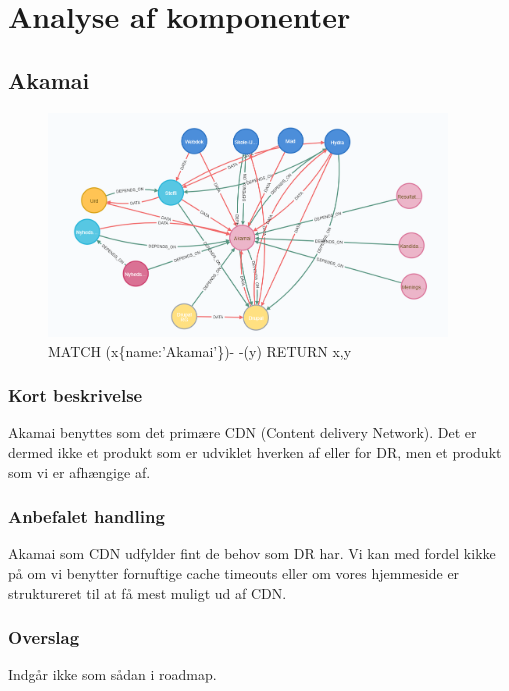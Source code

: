 \documentclass{article}
\begin{document}


\section{Analyse af komponenter}

\subsection{Akamai}
\begin{figure}[h]
\includegraphics[width=300pt]{Akamai.PNG}
\caption{MATCH (x\{name:'Akamai'\})- -(y) RETURN x,y}
\end{figure}
\subsubsection{Kort beskrivelse}
Akamai benyttes som det primære CDN (Content delivery Network). 
Det er dermed ikke et produkt som er udviklet hverken af eller for DR, 
men et produkt som vi er afhængige af. 
\subsubsection{Anbefalet handling}
Akamai som CDN udfylder fint de behov som DR har. 
Vi kan med fordel kikke på om vi benytter fornuftige cache timeouts eller om vores hjemmeside er struktureret til at få mest muligt ud af CDN.

\subsubsection{Overslag}
Indgår ikke som sådan i roadmap.
\end{document}
